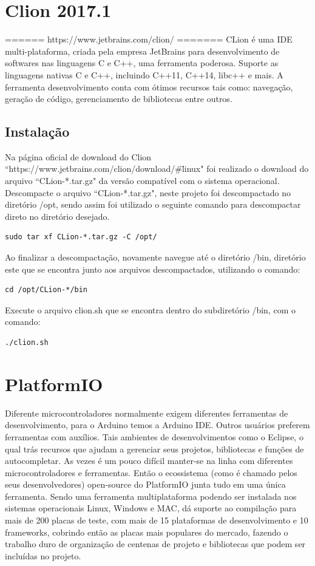 \documentclass[a4paper,12pt,portuguese]{ufms-cpcx}
\begin{document}
\section{Clion 2017.1}
====== https://www.jetbrains.com/clion/ =======
CLion é uma IDE multi-plataforma, criada pela empresa JetBrains para desenvolvimento de softwares nas linguagens C e C++, uma ferramenta poderosa. Suporte as linguagens nativas C e C++, incluindo C++11, C++14, libc++ e mais. A ferramenta desenvolvimento conta com ótimos recursos tais como: navegação, geração de código, gerenciamento de bibliotecas entre outros.
\subsection{Instalação}
Na página oficial de download do Clion ``https://www.jetbrains.com/clion/download/\#\=linux" foi realizado o download do arquivo ``CLion-*.tar.gz" da versão compatível com o sistema operacional. Descompacte o arquivo ``CLion-*.tar.gz", neste projeto foi descompactado no diretório /opt, sendo assim foi utilizado o seguinte comando para descompactar direto no diretório desejado.
\begin{lstlisting}
sudo tar xf CLion-*.tar.gz -C /opt/
\end{lstlisting}
Ao finalizar a descompactação, novamente navegue até o diretório /bin, diretório este que se encontra junto aos arquivos descompactados, utilizando o comando: 
\begin{lstlisting}
cd /opt/CLion-*/bin
\end{lstlisting}
Execute o arquivo clion.sh que se encontra dentro do subdiretório /bin, com o comando:
\begin{lstlisting}
./clion.sh
\end{lstlisting}

\section{PlatformIO}
Diferente microcontroladores normalmente exigem diferentes ferramentas de desenvolvimento, para o Arduino temos a Arduino IDE. Outros usuários preferem ferramentas com auxílios. Tais ambientes de desenvolvimentos como o Eclipse, o qual trás recursos que ajudam a gerenciar seus projetos, bibliotecas e funções de autocompletar. As vezes é um pouco difícil manter-se na linha com diferentes microcontroladores e ferramentas. Então o ecossistema (como é chamado pelos seus desenvolvedores) open-source do PlatformIO junta tudo em uma única ferramenta. Sendo uma ferramenta multiplataforma podendo ser instalada nos sistemas operacionais Linux, Windows e MAC, dá suporte ao compilação para mais de 200 placas de teste, com mais de 15 plataformas de desenvolvimento e 10 frameworks, cobrindo então as placas mais populares do mercado, fazendo o trabalho duro de organização de centenas de projeto e bibliotecas que podem ser incluídas no projeto.
\end{document}
